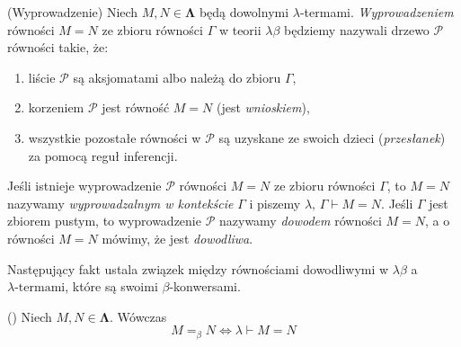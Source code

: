 \begin{definicja}(Wyprowadzenie)
Niech \(M, N\in\mathbf{\Lambda}\) będą dowolnymi \(\lambda\)-termami.
\emph{Wyprowadzeniem} równości \(M=N\) ze zbioru równości \(\Gamma\) w teorii \(\lambda\beta\) będziemy nazywali drzewo \(\mathcal{P}\) równości takie, że:
\begin{enumerate}[label={(\roman*)}, ref={(\roman*)}]
  \setlength\itemsep{0em}
  \item liście \(\mathcal{P}\) są aksjomatami albo należą do zbioru \(\Gamma\),
  \item korzeniem \(\mathcal{P}\) jest równość \(M=N\) (jest \emph{wnioskiem}),
  \item wszystkie pozostałe równości w \(\mathcal{P}\) są uzyskane ze swoich dzieci (\emph{przesłanek}) za pomocą reguł inferencji.
\end{enumerate}

Jeśli istnieje wyprowadzenie \(\mathcal{P}\) równości \(M=N\) ze zbioru równości \(\Gamma\), to \(M=N\) nazywamy \emph{wyprowadzalnym w kontekście} \(\Gamma\) i piszemy \(\lambda,\,\Gamma\vdash M=N\). Jeśli \(\Gamma\) jest zbiorem pustym, to wyprowadzenie \(\mathcal{P}\) nazywamy \emph{dowodem} równości \(M=N\), a o równości \(M=N\) mówimy, że jest \emph{dowodliwa}.
\end{definicja}

Następujący fakt ustala związek między równościami dowodliwymi w \(\lambda\beta\) a \(\lambda\text{-termami}\), które są swoimi \(\beta\)-konwersami.
\begin{fakt}(\cite[Lem. 6.4]{Hindley:2008:LCI:1388400})
Niech \(M, N\in\mathbf{\Lambda}\). Wówczas
\[
M=_\beta N \iff \lambda \vdash M=N
\]
\end{fakt}
